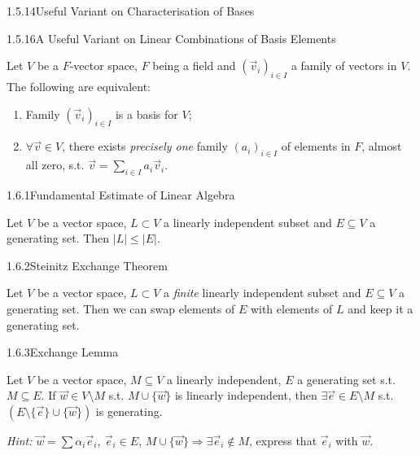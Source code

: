 \documentclass[10pt]{article} %
\renewcommand{\leq}{\leqslant}
\newcommand{\Hint}{\vspace{0.2em}\textit{Hint: }}
\begin{document}
\begin{multicols}{3}
\begin{theorem}{1.5.14}{Useful Variant on Characterisation of Bases}
\end{theorem}

\begin{theorem}{1.5.16}{A Useful Variant on Linear Combinations of Basis Elements}

    Let $V$ be a $F$-vector space, $F$ being a field and $(\vec{v}_i)_{i \in I}$ a family of vectors in $V$. The following are equivalent:

        \begin{enumerate}[(1)]
            \setlength{\parskip}{0em}
            \item Family $(\vec{v}_i)_{i \in I}$ is a basis for $V$;
            \item $\forall \vec{v} \in V$, there exists \emph{precisely one} family $(a_i)_{i \in I}$ of elements in $F$, almost all zero, s.t. $\vec{v} = \sum_{i \in I}a_i\vec{v}_i$.
        \end{enumerate}

\end{theorem}

\begin{theorem}{1.6.1}{Fundamental Estimate of Linear Algebra}

    Let $V$ be a vector space, $L \subset V$ a linearly independent subset and $E \subseteq V$ a generating set. Then $|L| \leq |E|$.

\end{theorem}

\begin{theorem}{1.6.2}{Steinitz Exchange Theorem}

    Let $V$ be a vector space, $L \subset V$ a \emph{finite} linearly independent subset and $E \subseteq V$ a generating set. Then we can swap elements of $E$ with elements of $L$ and keep it a generating set.

\end{theorem}

\begin{lemma}{1.6.3}{Exchange Lemma}

    Let $V$ be a vector space, $M \subseteq V$ a linearly independent, $E$ a generating set s.t. $M \subseteq E$. If $\vec{w} \in V \setminus M$ s.t. $M \cup \{ \vec{w} \}$ is linearly independent, then $\exists \vec{e} \in E \setminus M$ s.t. $(E \setminus \{\vec{e}\} \cup \{\vec{w}\})$ is generating.

    \Hint $\vec{w} = \sum \alpha_i \vec{e}_i,\ \vec{e}_i \in E$, $M \cup \{ \vec{w} \} \Rightarrow \exists \vec{e}_i \not\in M$, express that $\vec{e}_i$ with $\vec{w}$.


\end{lemma}
\end{multicols}
\end{document}
